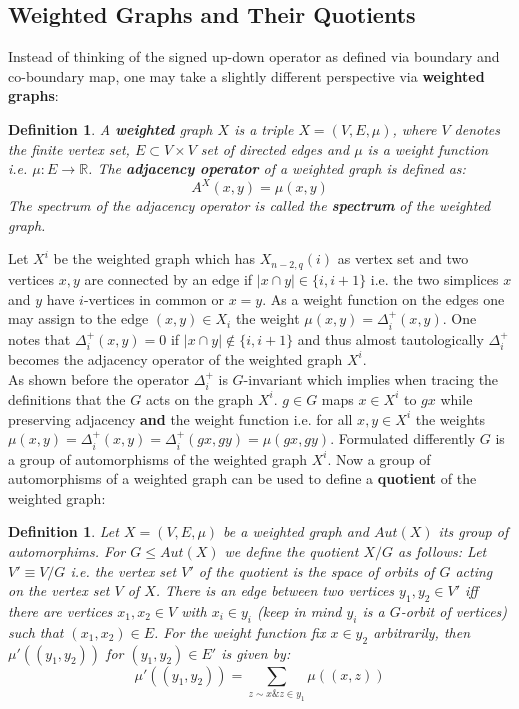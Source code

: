 \documentclass[11pt]{amsart}
\newtheorem{definition}[theorem]{Definition}
\begin{document}
    \subsection{Weighted Graphs and Their Quotients}
    Instead of thinking of the signed up-down operator as defined via boundary and co-boundary map, one may take a slightly different perspective via \textbf{weighted graphs}:
    \begin{definition}
		A \textbf{weighted} graph $X$ is a triple $X=(V, E, \mu)$, where $V$ denotes the finite vertex set, $E\subset V\times V$ set of directed edges and $\mu$ is a weight function i.e. $\mu:E\rightarrow \mathbb{R}$. The \textbf{adjacency operator} of a weighted graph is defined as:
        \begin{equation}
            A^X(x,y)=\mu(x,y)
        \end{equation}
        The spectrum of the adjacency operator is called the \textbf{spectrum} of the weighted graph.
	\end{definition} 
    Let $X^i$ be the weighted graph which has $X_{n-2,q}(i)$ as vertex set and two vertices $x,y$ are connected by an edge if $|x\cap y|\in \{i,i+1\}$ i.e. the two simplices $x$ and $y$ have $i$-vertices in common or $x=y$. As a weight function on the edges one may assign to the edge $(x,y)\in X_i$ the weight $\mu(x,y)=\Delta_i^+(x,y)$. One notes that $\Delta_i^+(x,y)=0$ if $|x\cap y|\notin\{i,i+1\}$ and thus almost tautologically $\Delta_i^+$ becomes the adjacency operator of the weighted graph $X^i$.\\
    As shown before the operator $\Delta_i^+$ is $G$-invariant which implies when tracing the definitions that the $G$ acts on the graph $X^i$. $g\in G$ maps $x\in X^i$ to $gx$ while preserving adjacency \textbf{and} the weight function i.e. for all $x,y\in X^i$ the weights $\mu(x,y)=\Delta_i^+(x,y)=\Delta_i^+(gx,gy)=\mu(gx,gy)$. Formulated differently $G$ is a group of automorphisms of the weighted graph $X^i$. Now a group of automorphisms of a weighted graph can be used to define a \textbf{quotient} of the weighted graph:
    \begin{definition}
		Let $X=(V,E,\mu)$ be a weighted graph and $Aut(X)$ its group of automorphims. For $G\leq Aut(X)$ we define the quotient $X/G$ as follows: Let $V'\equiv V/G$ i.e. the vertex set $V'$ of the quotient is the space of orbits of $G$ acting on the vertex set $V$ of $X$. There is an edge between two vertices $y_1,y_2\in V'$ iff there are vertices $x_1,x_2\in V$ with $x_i\in y_i$ (keep in mind $y_i$ is a $G$-orbit of vertices) such that $(x_1, x_2)\in E$. For the weight function fix $x\in y_2$ arbitrarily, then $\mu'((y_1, y_2))$ for $(y_1,y_2)\in E'$ is given by:
		\begin{equation}
			\mu'((y_1,y_2))=\sum_{z\sim x  \& z\in y_1}\mu((x,z))
		\end{equation} 
		\label{def:QuotientWeights}
	\end{definition}
\end{document}
